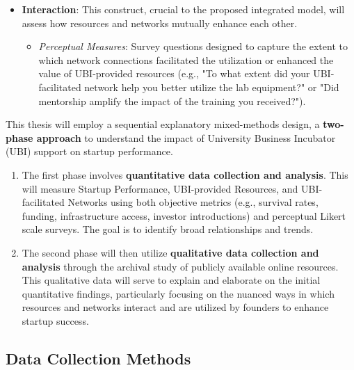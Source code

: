\documentclass[../Main.tex]{subfiles}
\begin{document}
\begin{itemize}
\begin{itemize}
          \end{itemize}
    \item \textbf{Interaction}: This construct, crucial to the proposed integrated model, will assess how resources and networks mutually enhance each other.
          \begin{itemize}
              \item \textit{Perceptual Measures}: Survey questions designed to capture the extent to which network connections facilitated the utilization or enhanced the value of UBI-provided resources (e.g., "To what extent did your UBI-facilitated network help you better utilize the lab equipment?" or "Did mentorship amplify the impact of the training you received?").
          \end{itemize}
\end{itemize}

\begin{condensed_idea}
    This thesis will employ a sequential explanatory mixed-methods design, a \textbf{two-phase approach} to understand the impact of University Business Incubator (UBI) support on startup performance.

    \begin{enumerate}
        \item The first phase involves \textbf{quantitative data collection and analysis}.
              This will measure Startup Performance, UBI-provided Resources, and
              UBI-facilitated Networks using both objective metrics (e.g., survival rates,
              funding, infrastructure access, investor introductions) and perceptual Likert
              scale surveys. The goal is to identify broad relationships and trends.

        \item The second phase will then utilize \textbf{qualitative data collection and
                  analysis} through the archival study of publicly available online resources.
              This qualitative data will serve to explain and elaborate on the initial
              quantitative findings, particularly focusing on the nuanced ways in which
              resources and networks interact and are utilized by founders to enhance startup
              success.
    \end{enumerate}
\end{condensed_idea}

\subsection{Data Collection Methods}
\end{document}
